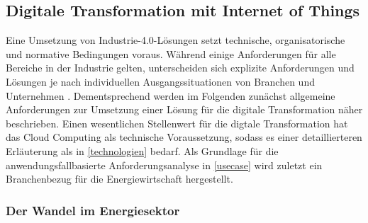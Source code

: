 \subsection{Digitale Transformation mit Internet of Things}

Eine Umsetzung von Industrie-4.0-Lösungen setzt technische, organisatorische und normative Bedingungen voraus. Während einige Anforderungen für alle Bereiche in der Industrie gelten, unterscheiden sich explizite Anforderungen und Lösungen je nach individuellen Ausgangssituationen von Branchen und Unternehmen \citep{Bauer2014}. Dementsprechend werden im Folgenden zunächst allgemeine Anforderungen zur Umsetzung einer Lösung für die digitale Transformation näher beschrieben. Einen wesentlichen Stellenwert für die digtale Transformation hat das Cloud Computing als technische Voraussetzung, sodass es einer detaillierteren Erläuterung als in \ref{technologien} bedarf. Als Grundlage für die anwendungsfallbasierte Anforderungsanalyse in \ref{usecase} wird zuletzt ein Branchenbezug für die Energiewirtschaft hergestellt.

\subsubsection{Der Wandel im Energiesektor}

